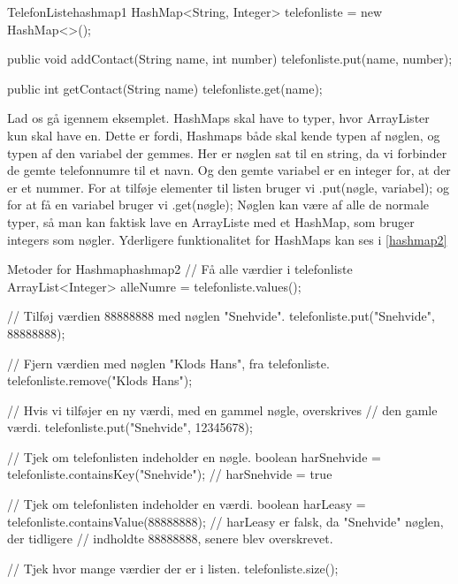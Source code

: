 \begin{JavaCode}{TelefonListe}{hashmap1}
	HashMap<String, Integer> telefonliste = new HashMap<>();

	public void addContact(String name, int number){
		telefonliste.put(name, number);
	}

	public int getContact(String name){
		telefonliste.get(name);
	}
\end{JavaCode}

Lad os gå igennem eksemplet. HashMaps skal have to typer, hvor
ArrayLister kun skal have en. Dette er fordi, Hashmaps både skal
kende typen af nøglen, og typen af den variabel der gemmes. Her er
nøglen sat til en string, da vi forbinder de gemte telefonnumre til et
navn. Og den gemte variabel er en integer for, at  der er et nummer.
For at tilføje elementer til listen bruger vi .put(nøgle, variabel);
og for at få en variabel bruger vi .get(nøgle); Nøglen kan være af
alle de normale typer, så man kan faktisk lave en ArrayListe med et
HashMap, som bruger integers som nøgler. Yderligere funktionalitet for
HashMaps kan ses i \autoref{hashmap2}

\begin{JavaCode}{Metoder for Hashmap}{hashmap2}
    // Få alle værdier i telefonliste
	ArrayList<Integer> alleNumre = telefonliste.values();

    // Tilføj værdien 88888888 med nøglen "Snehvide".
    telefonliste.put("Snehvide", 88888888);

    // Fjern værdien med nøglen "Klods Hans", fra telefonliste.
	telefonliste.remove("Klods Hans");

    // Hvis vi tilføjer en ny værdi, med en gammel nøgle, overskrives
    // den gamle værdi.
    telefonliste.put("Snehvide", 12345678);

    // Tjek om telefonlisten indeholder en nøgle.
	boolean harSnehvide = telefonliste.containsKey("Snehvide");
    // harSnehvide = true

    // Tjek om telefonlisten indeholder en værdi.
	boolean harLeasy = telefonliste.containsValue(88888888);
    // harLeasy er falsk, da "Snehvide" nøglen, der tidligere
    // indholdte 88888888, senere blev overskrevet.

    // Tjek hvor mange værdier der er i listen.
	telefonliste.size();
\end{JavaCode}



